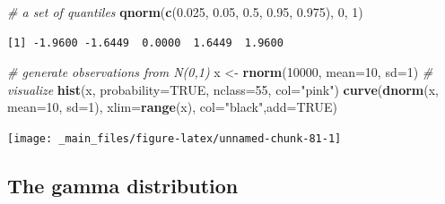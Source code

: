 \documentclass[
]{book}
\newenvironment{Shaded}{\begin{snugshade}}{\end{snugshade}}
\newcommand{\CommentTok}[1]{\textcolor[rgb]{0.56,0.35,0.01}{\textit{#1}}}
\newcommand{\DataTypeTok}[1]{\textcolor[rgb]{0.13,0.29,0.53}{#1}}
\newcommand{\DecValTok}[1]{\textcolor[rgb]{0.00,0.00,0.81}{#1}}
\newcommand{\FloatTok}[1]{\textcolor[rgb]{0.00,0.00,0.81}{#1}}
\newcommand{\KeywordTok}[1]{\textcolor[rgb]{0.13,0.29,0.53}{\textbf{#1}}}
\newcommand{\NormalTok}[1]{#1}
\newcommand{\OtherTok}[1]{\textcolor[rgb]{0.56,0.35,0.01}{#1}}
\newcommand{\StringTok}[1]{\textcolor[rgb]{0.31,0.60,0.02}{#1}}
\begin{document}
\begin{Shaded}
\begin{Highlighting}[]
\CommentTok{# a set of quantiles}
\KeywordTok{qnorm}\NormalTok{(}\KeywordTok{c}\NormalTok{(}\FloatTok{0.025}\NormalTok{, }\FloatTok{0.05}\NormalTok{, }\FloatTok{0.5}\NormalTok{, }\FloatTok{0.95}\NormalTok{, }\FloatTok{0.975}\NormalTok{), }\DecValTok{0}\NormalTok{, }\DecValTok{1}\NormalTok{)}
\end{Highlighting}
\end{Shaded}

\begin{verbatim}
[1] -1.9600 -1.6449  0.0000  1.6449  1.9600
\end{verbatim}

\begin{Shaded}
\begin{Highlighting}[]
\CommentTok{# generate observations from N(0,1)}
\NormalTok{x <-}\StringTok{ }\KeywordTok{rnorm}\NormalTok{(}\DecValTok{10000}\NormalTok{, }\DataTypeTok{mean=}\DecValTok{10}\NormalTok{, }\DataTypeTok{sd=}\DecValTok{1}\NormalTok{)}
\CommentTok{# visualize}
\KeywordTok{hist}\NormalTok{(x, }\DataTypeTok{probability=}\OtherTok{TRUE}\NormalTok{, }\DataTypeTok{nclass=}\DecValTok{55}\NormalTok{, }\DataTypeTok{col=}\StringTok{"pink"}\NormalTok{)}
\KeywordTok{curve}\NormalTok{(}\KeywordTok{dnorm}\NormalTok{(x, }\DataTypeTok{mean=}\DecValTok{10}\NormalTok{, }\DataTypeTok{sd=}\DecValTok{1}\NormalTok{), }\DataTypeTok{xlim=}\KeywordTok{range}\NormalTok{(x), }\DataTypeTok{col=}\StringTok{"black"}\NormalTok{,}\DataTypeTok{add=}\OtherTok{TRUE}\NormalTok{)}
\end{Highlighting}
\end{Shaded}

\begin{center}\texttt{[image: \_main\_files/figure-latex/unnamed-chunk-81-1]} \end{center}

\hypertarget{the-gamma-distribution}{%
\subsection{The gamma distribution}\label{the-gamma-distribution}}
\end{document}
